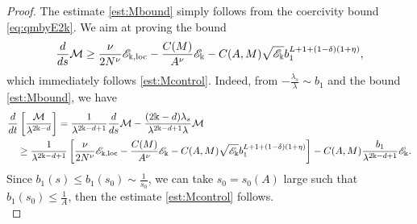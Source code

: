 \documentclass[11pt]{aims}
\theoremstyle{definition}
\numberwithin{equation}{section}
\begin{document}
\begin{proof} The estimate \eqref{est:Mbound} simply follows from the coercivity bound \eqref{eq:qmbyE2k}. We aim at proving the bound 
\begin{equation}\label{eq:Mcon}
\frac{d}{ds}{\mathcal{M}} \geq  \frac{\nu}{2N^\nu}{\mathscr{E}}_{\Bbbk,\textup{loc}} - \frac{C(M)}{A^\nu} {\mathscr{E}}_\Bbbk - C(A,M)\sqrt{{\mathscr{E}}_\Bbbk}b_1^{L + 1 + (1 - \delta)(1 + \eta)},
\end{equation}
which immediately follows \eqref{est:Mcontrol}. Indeed, from $-\frac{\lambda_s}{\lambda} \sim b_1$ and the bound \eqref{est:Mbound}, we have 
\begin{align*}
&\frac{d}{dt}\left[\frac{\mathcal{M}}{\lambda^{2\Bbbk - d}}\right] = \frac{1}{\lambda^{2\Bbbk - d + 1}}\frac{d}{ds}{\mathcal{M}} - \frac{(2\Bbbk - d)\lambda_s}{\lambda^{2\Bbbk - d + 1}\lambda} {\mathcal{M}}\\
& \quad \geq \frac{1}{\lambda^{2\Bbbk - d + 1}}\left[ \frac{\nu}{2N^\nu}{\mathscr{E}}_{\Bbbk,\textup{loc}} - \frac{C(M)}{A^\nu} {\mathscr{E}}_\Bbbk - C(A,M)\sqrt{{\mathscr{E}}_\Bbbk}b_1^{L + 1 + (1 - \delta)(1 + \eta)} \right] - C(A,M)\frac{b_1}{\lambda^{2\Bbbk - d + 1}}{\mathscr{E}}_\Bbbk.
\end{align*}
Since $b_1(s) \leq b_1(s_0)\sim \frac{1}{s_0}$, we can take $s_0 = s_0(A)$ large such that $b_1(s_0) \leq \frac{1}{A}$, then the estimate \eqref{est:Mcontrol} follows. \\


\end{proof}
\end{document}
